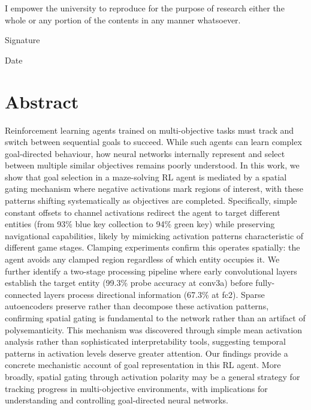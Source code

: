 \documentclass[12pt,a4paper]{report}
\begin{document}
I empower the university to reproduce for the purpose of research either the whole or any portion of the contents in any manner whatsoever.

\vspace{2cm}
\noindent\makebox[2.5in]{\hrulefill}

\noindent Signature

\vspace{0.5cm}
\noindent\makebox[2.5in]{\hrulefill}

\noindent Date

\clearpage

\chapter*{Abstract}
Reinforcement learning agents trained on multi-objective tasks must track and switch between sequential goals to succeed. While such agents can learn complex goal-directed behaviour, how neural networks internally represent and select between multiple similar objectives remains poorly understood. In this work, we show that goal selection in a maze-solving RL agent is mediated by a spatial gating mechanism where negative activations mark regions of interest, with these patterns shifting systematically as objectives are completed. Specifically, simple constant offsets to channel activations redirect the agent to target different entities (from 93\% blue key collection to 94\% green key) while preserving navigational capabilities, likely by mimicking activation patterns characteristic of different game stages. Clamping experiments confirm this operates spatially: the agent avoids any clamped region regardless of which entity occupies it. We further identify a two-stage processing pipeline where early convolutional layers establish the target entity (99.3\% probe accuracy at conv3a) before fully-connected layers process directional information (67.3\% at fc2). Sparse autoencoders preserve rather than decompose these activation patterns, confirming spatial gating is fundamental to the network rather than an artifact of polysemanticity. This mechanism was discovered through simple mean activation analysis rather than sophisticated interpretability tools, suggesting temporal patterns in activation levels deserve greater attention. Our findings provide a concrete mechanistic account of goal representation in this RL agent. More broadly, spatial gating through activation polarity may be a general strategy for tracking progress in multi-objective environments, with implications for understanding and controlling goal-directed neural networks.
\end{document}
